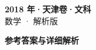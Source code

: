 \documentclass[zihao=-4, a4paper]{ctexart}
\begin{document}
\begin{center}
  {\Large\bfseries 2018 年·天津卷·文科}\\[4pt]
  {\large 数学 · 解析版}
\end{center}
\medskip
{}

\clearpage
{}
\begin{center}{\Large\bfseries 参考答案与详细解析}\end{center}
\medskip

\end{document}
